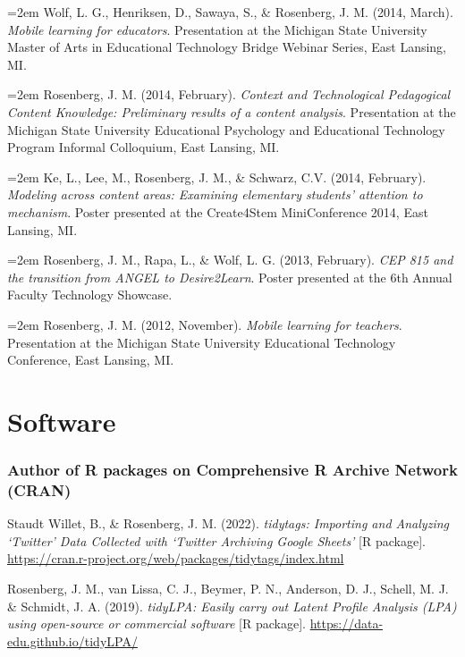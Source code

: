 \documentclass[
  14,
]{article}
\begin{document}
\hangindent=2em Wolf, L. G., Henriksen, D., Sawaya, S., \& Rosenberg, J.
M. (2014, March). \emph{Mobile learning for educators}. Presentation at
the Michigan State University Master of Arts in Educational Technology
Bridge Webinar Series, East Lansing, MI.

\hangindent=2em Rosenberg, J. M. (2014, February). \emph{Context and
Technological Pedagogical Content Knowledge: Preliminary results of a
content analysis}. Presentation at the Michigan State University
Educational Psychology and Educational Technology Program Informal
Colloquium, East Lansing, MI.

\hangindent=2em Ke, L., Lee, M., Rosenberg, J. M., \& Schwarz, C.V.
(2014, February). \emph{Modeling across content areas: Examining
elementary students' attention to mechanism}. Poster presented at the
Create4Stem MiniConference 2014, East Lansing, MI.

\hangindent=2em Rosenberg, J. M., Rapa, L., \& Wolf, L. G. (2013,
February). \emph{CEP 815 and the transition from ANGEL to Desire2Learn}.
Poster presented at the 6th Annual Faculty Technology Showcase.

\hangindent=2em Rosenberg, J. M. (2012, November). \emph{Mobile learning
for teachers}. Presentation at the Michigan State University Educational
Technology Conference, East Lansing, MI.

\hypertarget{software}{%
\section{Software}\label{software}}

\hypertarget{author-of-r-packages-on-comprehensive-r-archive-network-cran}{%
\subsubsection{Author of R packages on Comprehensive R Archive Network
(CRAN)}\label{author-of-r-packages-on-comprehensive-r-archive-network-cran}}

Staudt Willet, B., \& Rosenberg, J. M. (2022). \emph{tidytags: Importing
and Analyzing `Twitter' Data Collected with `Twitter Archiving Google
Sheets'} {[}R package{]}.
\url{https://cran.r-project.org/web/packages/tidytags/index.html}

Rosenberg, J. M., van Lissa, C. J., Beymer, P. N., Anderson, D. J.,
Schell, M. J. \& Schmidt, J. A. (2019). \emph{tidyLPA: Easily carry out
Latent Profile Analysis (LPA) using open-source or commercial software}
{[}R package{]}. \url{https://data-edu.github.io/tidyLPA/}
\end{document}
